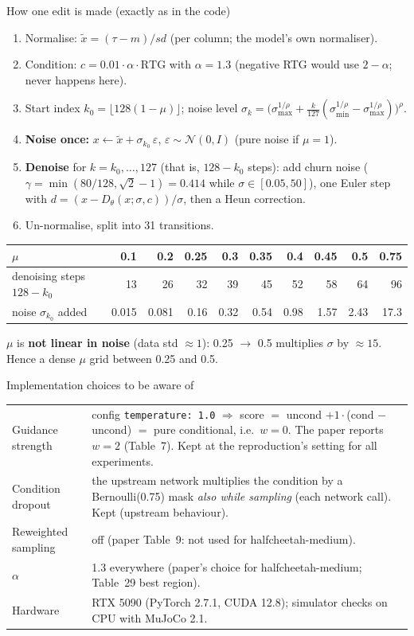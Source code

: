 \documentclass[aspectratio=169,11pt]{beamer}
\begin{document}
\begin{frame}{How one edit is made (exactly as in the code)}
\small
\begin{enumerate}
\item Normalise: $\tilde x=(\tau-m)/sd$ (per column; the model's own normaliser).
\item Condition: $c=0.01\cdot\alpha\cdot\text{RTG}$ with $\alpha=1.3$ (negative RTG would use $2-\alpha$; never happens here).
\item Start index $k_0=\lfloor128(1-\mu)\rfloor$; noise level $\sigma_{k}=\big(\sigma_{\max}^{1/\rho}+\tfrac{k}{127}(\sigma_{\min}^{1/\rho}-\sigma_{\max}^{1/\rho})\big)^{\rho}$.
\item \textbf{Noise once:} $x\leftarrow\tilde x+\sigma_{k_0}\,\varepsilon$, $\varepsilon\sim\mathcal N(0,I)$ (pure noise if $\mu=1$).
\item \textbf{Denoise} for $k=k_0,\dots,127$ (that is, $128-k_0$ steps): add churn noise ($\gamma=\min(80/128,\sqrt2-1)=0.414$ while $\sigma\in[0.05,50]$), one Euler step with $d=(x-D_\theta(x;\sigma,c))/\sigma$, then a Heun correction.
\item Un-normalise, split into 31 transitions.
\end{enumerate}
\centering\footnotesize
\begin{tabular}{lrrrrrrrrr}
\toprule
$\mu$ & 0.1 & 0.2 & 0.25 & 0.3 & 0.35 & 0.4 & 0.45 & 0.5 & 0.75\\
\midrule
denoising steps $128-k_0$ & 13 & 26 & 32 & 39 & 45 & 52 & 58 & 64 & 96\\
noise $\sigma_{k_0}$ added & 0.015 & 0.081 & 0.16 & 0.32 & 0.54 & 0.98 & 1.57 & 2.43 & 17.3\\
\bottomrule
\end{tabular}

\raggedright\small $\mu$ is \textbf{not linear in noise} (data std $\approx1$): 0.25 $\to$ 0.5 multiplies $\sigma$ by $\approx15$. Hence a dense $\mu$ grid between 0.25 and 0.5.
\end{frame}

\begin{frame}{Implementation choices to be aware of}
\begin{tabularx}{\linewidth}{lY}
\toprule
Guidance strength & config \texttt{temperature: 1.0} $\Rightarrow$ score $=$ uncond $+1\cdot$(cond $-$ uncond) $=$ pure conditional, i.e.\ $w=0$. The paper reports $w=2$ (Table~7). Kept at the reproduction's setting for all experiments.\\
Condition dropout & the upstream network multiplies the condition by a Bernoulli(0.75) mask \emph{also while sampling} (each network call). Kept (upstream behaviour).\\
Reweighted sampling & off (paper Table~9: not used for halfcheetah-medium).\\
$\alpha$ & 1.3 everywhere (paper's choice for halfcheetah-medium; Table~29 best region).\\
Hardware & RTX 5090 (PyTorch 2.7.1, CUDA 12.8); simulator checks on CPU with MuJoCo 2.1.\\
\bottomrule
\end{tabularx}
\end{frame}
\end{document}
